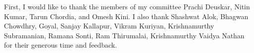 First, I would like to thank the members of my committee Prachi Deuskar, Nitin Kumar, Tarun Chordia, and Omesh Kini. I also thank Shashwat Alok, Bhagwan Chowdhry, Goyal, Sanjay Kallapur, Vikram Kuriyan, Krishnamurthy Subramanian, Ramana Sonti, Ram Thirumalai, Krishnamurthy Vaidya Nathan for their generous time and feedback.